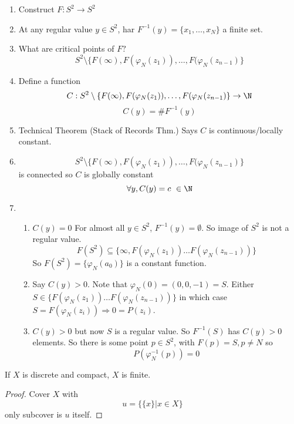 \begin{enumerate}[(1)]
  \item  Construct $F:S^2 \to S^2$
  \item  At any regular value $y\in S^2$, har $F^{-1}(y)=\{x_1,\dots ,x_N\}$ a finite set.
  \item What are critical points of $F?$
    $$S^2\setminus\{F(\infty),F(\varphi _N(z_1)),\dots,F(\varphi _N(z_{n-1})\}$$
  \item Define a function
    $$C:S^2\setminus\{F(\infty),F(\varphi _N(z_1)),\dots,F(\varphi _N(z_{n-1})\}\to \N$$
    $$C(y)=\#F^{-1}(y)$$
  \item Technical Theorem (Stack of Records Thm.)
  \newline Says $C$ is continuous/locally constant.
  \item $$S^2\setminus\{F(\infty),F(\varphi _N(z_1)),\dots,F(\varphi _N(z_{n-1})\}$$
  is connected so $C$ is globally constant
    $$\forall y, C(y)=c \in \N$$
  \item
    \begin{enumerate}[Case (1)]
      \item $C(y)=0$
      \newline For almost all $y\in S^2$, $F^{-1}(y)=\emptyset$.
      So image of $S^2$ is not a regular value.
        $$F(S^2)\subseteq \{\infty,F(\varphi _N(z_1))\dots F(\varphi _N(z_{n-1}))\}$$
      So $F(S^2)=\{\varphi _N(a_0)\}$ is a constant function.
      \item Say $C(y)>0$.
      \newline Note that $\varphi _N(0)=(0,0,-1)=S$.
      \newline Either $S\in \{F(\varphi _N(z_1))\dots F(\varphi _N(z_{n-1}))\}$ in which case $S=F(\varphi _N(z_i)) \Rightarrow 0=P(z_i)$.
      \item $C(y)>0$ but now $S$ is a regular value. So $F^{-1}(S)$ has $C(y)>0$ elements. So there is some point $p\in S^2$, with $F(p)=S, p\neq N$ so
        $$P(\varphi ^{-1}_N(p))=0$$
        \qedhere
    \end{enumerate}
\end{enumerate}

\begin{lemma}
  If $X$ is discrete and compact, $X$ is finite.
\end{lemma}
\begin{proof}
  Cover $X$ with
    $$u=\{\{x\} |x\in X \}$$
  only subcover is $u$ itself.
\end{proof}

